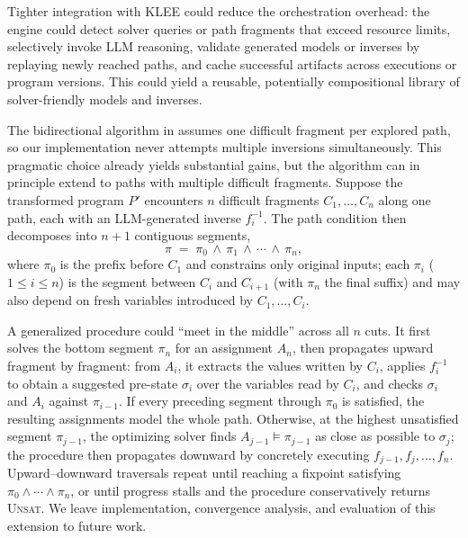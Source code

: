 \documentclass[acmsmall]{acmart}
\newenvironment{revblock}{\color{red}}{}
\newenvironment{revblock}{}{}
\theoremstyle{definition}
\begin{document}
Tighter integration with KLEE could reduce the orchestration overhead: the engine could detect solver queries or path fragments that exceed resource limits, selectively invoke LLM reasoning, validate generated models or inverses by replaying newly reached paths, and cache successful artifacts across executions or program versions. This could yield a reusable, potentially compositional library of solver-friendly models and inverses.

\begin{revblock}

The bidirectional algorithm in  assumes one difficult fragment per explored path, so our implementation never attempts multiple inversions simultaneously. This pragmatic choice already yields substantial gains, but the algorithm can in principle extend to paths with multiple difficult fragments. Suppose the transformed program $P'$ encounters $n$ difficult fragments $C_1,\ldots,C_n$ along one path, each with an LLM-generated inverse $f_i^{-1}$. The path condition then decomposes into $n+1$ contiguous segments,
\[
\pi \;=\; \pi_0 \,\wedge\, \pi_1 \,\wedge\, \cdots \,\wedge\, \pi_n,
\]
where $\pi_0$ is the prefix before $C_1$ and constrains only original inputs; each $\pi_i$ ($1\le i\le n$) is the segment between $C_i$ and $C_{i+1}$ (with $\pi_n$ the final suffix) and may also depend on fresh variables introduced by $C_1,\ldots,C_i$.

A generalized procedure could ``meet in the middle'' across all $n$ cuts. It first solves the bottom segment $\pi_n$ for an assignment $A_n$, then propagates upward fragment by fragment: from $A_i$, it extracts the values written by $C_i$, applies $f_i^{-1}$ to obtain a suggested pre-state $\sigma_i$ over the variables read by $C_i$, and checks $\sigma_i$ and $A_i$ against $\pi_{i-1}$. If every preceding segment through $\pi_0$ is satisfied, the resulting assignments model the whole path. Otherwise, at the highest unsatisfied segment $\pi_{j-1}$, the optimizing solver finds $A_{j-1}\models\pi_{j-1}$ as close as possible to $\sigma_j$; the procedure then propagates downward by concretely executing $f_{j-1}, f_j, \ldots, f_n$. Upward--downward traversals repeat until reaching a fixpoint satisfying $\pi_0\wedge\cdots\wedge\pi_n$, or until progress stalls and the procedure conservatively returns \textsc{Unsat}. We leave implementation, convergence analysis, and evaluation of this extension to future work.

\end{revblock}
\end{document}
